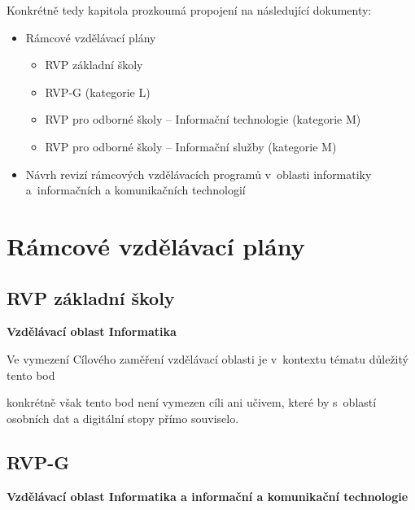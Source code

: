 Konkrétně tedy kapitola prozkoumá propojení na následující dokumenty:

\begin{itemize}
\item Rámcové vzdělávací plány
	\begin{itemize}
    \item RVP základní školy \citep{rvp-zs}
    \item RVP-G (kategorie L) \citep{rvp-g}
    \item RVP pro odborné školy -- Informační technologie \citep{rvp-it} (kategorie M)
    \item RVP pro odborné školy -- Informační služby\citep{rvp-is} (kategorie M)
	\end{itemize}
\item Návrh revizí rámcových vzdělávacích programů v oblasti informatiky a informačních a komunikačních technologií \citep{revize}
\end{itemize}

\section{Rámcové vzdělávací plány}

\subsection{RVP základní školy}

\textbf{Vzdělávací oblast Informatika}

Ve vymezení Cílového zaměření vzdělávací oblasti je v~kontextu tématu důležitý tento bod

\begin{displayquote}
	\citep{rvp-zs}
\end{displayquote}

konkrétně však tento bod není vymezen cíli ani učivem, které by s~oblastí osobních dat a digitální stopy přímo souviselo.

\subsection{RVP-G}

\textbf{Vzdělávací oblast Informatika a informační a komunikační technologie}

